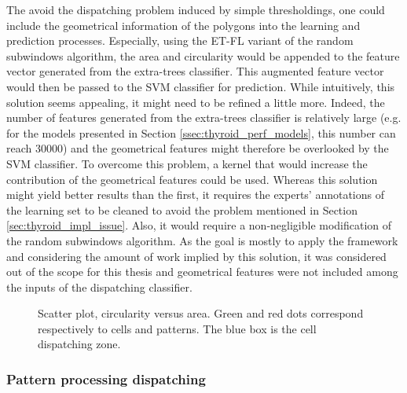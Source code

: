 The avoid the dispatching problem induced by simple thresholdings, one could include the geometrical information of the polygons into the learning and prediction processes. Especially, using the ET-FL variant of the random subwindows algorithm, the area and circularity would be appended to the feature vector generated from the extra-trees classifier. This augmented feature vector would then be passed to the SVM classifier for prediction. While intuitively, this solution seems appealing, it might need to be refined a little more. Indeed, the number of features generated from the extra-trees classifier is relatively large (e.g. for the models presented in Section \ref{ssec:thyroid_perf_models}, this number can reach 30000) and the geometrical features might therefore be overlooked by the SVM classifier. To overcome this problem, a kernel that would increase the contribution of the geometrical features could be used. Whereas this solution might yield better results than the first, it requires the experts' annotations of the learning set to be cleaned to avoid the problem mentioned in Section \ref{sec:thyroid_impl_issue}. Also, it would require a non-negligible modification of the random subwindows algorithm. As the goal is mostly to apply the framework and considering the amount of work implied by this solution, it was considered out of the scope for this thesis and geometrical features were not included among the inputs of the dispatching classifier.

\begin{figure}
	\center
	\caption{Scatter plot, circularity versus area. Green and red dots correspond respectively to cells and patterns. The blue box is the cell dispatching zone.}
	\label{fig:scatter_area_circ_cell_vs_pattern}
\end{figure}

\subsubsection{Pattern processing dispatching}
	
